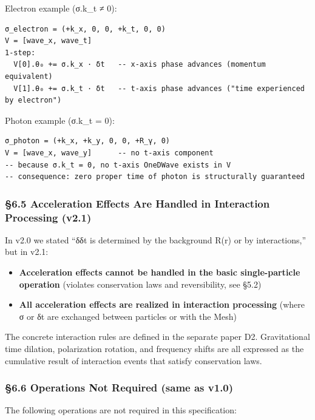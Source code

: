 \documentclass[a4paper,11pt]{article}
\providecommand{\tightlist}{\setlength{\itemsep}{0pt}\setlength{\parskip}{0pt}}
\begin{document}
Electron example (σ.k\_t ≠ 0):

\begin{verbatim}
σ_electron = (+k_x, 0, 0, +k_t, 0, 0)
V = [wave_x, wave_t]
1-step:
  V[0].θ₀ += σ.k_x · δt   -- x-axis phase advances (momentum equivalent)
  V[1].θ₀ += σ.k_t · δt   -- t-axis phase advances ("time experienced by electron")
\end{verbatim}

Photon example (σ.k\_t = 0):

\begin{verbatim}
σ_photon = (+k_x, +k_y, 0, 0, +R_γ, 0)
V = [wave_x, wave_y]      -- no t-axis component
-- because σ.k_t = 0, no t-axis OneDWave exists in V
-- consequence: zero proper time of photon is structurally guaranteed
\end{verbatim}

\subsubsection{§6.5 Acceleration Effects Are Handled in Interaction
Processing
(v2.1)}\label{acceleration-effects-are-handled-in-interaction-processing-v2.1}

In v2.0 we stated ``δδt is determined by the background R(r) or by
interactions,'' but in v2.1:

\begin{itemize}
\tightlist
\item
  \textbf{Acceleration effects cannot be handled in the basic
  single-particle operation} (violates conservation laws and
  reversibility, see §5.2)
\item
  \textbf{All acceleration effects are realized in interaction
  processing} (where σ or δt are exchanged between particles or with the
  Mesh)
\end{itemize}

The concrete interaction rules are defined in the separate paper D2.
Gravitational time dilation, polarization rotation, and frequency shifts
are all expressed as the cumulative result of interaction events that
satisfy conservation laws.

\subsubsection{§6.6 Operations Not Required (same as
v1.0)}\label{operations-not-required-same-as-v1.0}

The following operations are not required in this specification:
\end{document}
